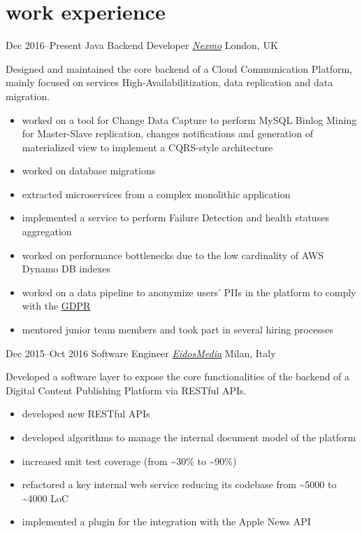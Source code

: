 \vspace{-.4cm}
\section{\normalfont work experience}

\begin{entrylist}
\entry
{Dec 2016--Present}
{Java Backend Developer {\normalfont \emph{\href{https://www.nexmo.com/}{Nexmo}}}}
{London, UK}
{Designed and maintained the core backend of a Cloud Communication Platform, mainly focused on services High-Availabilitization, data replication and data migration.
\vspace{-.2cm}
\begin{itemize}[leftmargin=.6cm]
	\item worked on a tool for Change Data Capture to perform MySQL Binlog Mining for Master-Slave replication, changes notifications and generation of materialized view to implement a CQRS-style architecture
	\item worked on database migrations
	\item extracted microservices from a complex monolithic application
	\item implemented a service to perform Failure Detection and health statuses aggregation
	\item worked on performance bottlenecks due to the low cardinality of AWS Dynamo DB indexes
	\item worked on a data pipeline to anonymize users' PIIs in the platform to comply with the \href{https://en.wikipedia.org/wiki/General_Data_Protection_Regulation}{GDPR}
	\item mentored junior team members and took part in several hiring processes
\end{itemize}
}

\entry
{Dec 2015--Oct 2016}
{Software Engineer {\normalfont \emph{\href{https://www.eidosmedia.com/}{EidosMedia}}}}
{Milan, Italy}
{Developed a software layer to expose the core functionalities of the backend of a Digital Content Publishing Platform via RESTful APIs.  
\vspace{-.2cm}
\begin{itemize}[leftmargin=.6cm] 
	\item developed new RESTful APIs  
	\item developed algorithms to manage the internal document model of the platform
	\item increased unit test coverage (from \textasciitilde 30\% to \textasciitilde 90\%)
	\item refactored a key internal web service reducing its codebase from \textasciitilde 5000 to \textasciitilde 4000 LoC
	\item implemented a plugin for the integration with the Apple News API 
\end{itemize}
}


\end{entrylist}

